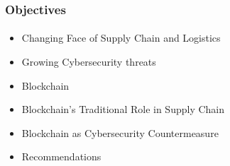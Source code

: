 \begin{frame}
  \frametitle{Objectives}
  \framesubtitle{}
  \begin{itemize}
    \item<1-> Changing Face of Supply Chain and Logistics
    \item <2-> Growing Cybersecurity threats
    \item <3-> Blockchain
    \item <4-> Blockchain's Traditional Role in Supply Chain
    \item <5-> Blockchain as Cybersecurity Countermeasure
    \item <6-> Recommendations

           {\scriptsize{}}

  \end{itemize}
\end{frame}
